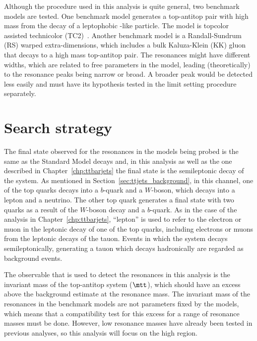 Although the procedure used in this analysis is quite general, two benchmark models are tested.
One benchmark model generates a top-antitop pair with high mass from the decay of a leptophobic \zprime-like particle. The model is
topcolor assisted technicolor (TC2)~\cite{Hill:1994hp,Harris:1999ya,Harris:2011ez}. Another benchmark model is a Randall-Sundrum (RS)
warped extra-dimensions, which includes a bulk Kaluza-Klein (KK) gluon~\cite{Lillie:2007yh,Lillie:2007ve} that decays to a high mass top-antitop pair.
The resonances might have different widths, which are related to
free parameters in the model, leading (theoretically) to the resonance
peaks being narrow or broad.
A broader peak would be detected
less easily and must have its hypothesis tested in the limit setting procedure separately.

\section{Search strategy}
\label{sec:ttbarres7_strategy}

The final state observed for the resonances in the models being probed is the same as the Standard Model \ttbar decays and, in this analysis as well as the
one described in Chapter~\ref{chp:ttbarjets} the final state is the semileptonic decay of the \ttbar system. As mentioned in Section~\ref{sec:ttjets_background},
in this channel, one of the top quarks decays into a $b$-quark and a $W$-boson, which decays into a lepton and a neutrino. The other top quark generates a
final state with two quarks as a result of the $W$-boson decay and a $b$-quark.
As in the case of the analysis in Chapter~\ref{chp:ttbarjets}, ``lepton''
is used to refer to the electron or muon in the leptonic decay of one of the
top quarks, including electrons or muons from the leptonic decays of the
tauon. Events in which the \ttbar system decays semileptonically,
generating a tauon which decays hadronically are regarded as
background events.

The observable that is used to detect the \ttbar resonances in this analysis is the invariant mass of the top-antitop system ($\mtt$),
which should have an excess above the background estimate at the resonance mass. The invariant mass of the resonances in the benchmark models
are not parameters fixed by the models, which means that a compatibility test for this excess for a range of resonance masses must be done.
However, low resonance masses have already been tested in previous analyses, so this analysis will focus on the high \mtt region.

